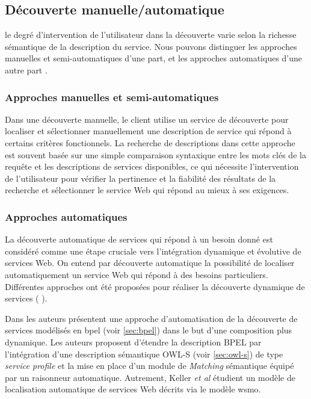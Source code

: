   \subsection{Découverte manuelle/automatique}
  \label{sec:ws-desc:manual-vs-auto}
  le degré d'intervention de l'utilisateur dans la découverte varie
  selon la richesse sémantique de la description du service. Nous
  pouvons distinguer les approches manuelles et semi-automatiques d'une
  part, et les approches automatiques d'une autre part
  \cite{elie2010,garofalakis2004web}.

    \subsubsection{Approches manuelles et semi-automatiques}
    Dans une découverte manuelle, le client utilise un service de
    découverte pour localiser et sélectionner manuellement une
    description de service qui répond à certains critères
    fonctionnels. La recherche de descriptions dans cette approche est
    souvent basée sur une simple comparaison syntaxique entre les mots
    clés de la requête et les descriptions de services disponibles, ce
    qui nécessite l'intervention de l'utilisateur pour vérifier la
    pertinence et la fiabilité des résultats de la recherche et
    sélectionner le service Web qui répond au mieux à ses exigences.

    \subsubsection{Approches automatiques}
    La découverte automatique de services qui répond à un besoin donné
    est considéré comme une étape cruciale vers l'intégration
    dynamique et évolutive de services Web. On entend par découverte
    automatique la possibilité de localiser automatiquement un service
    Web qui répond à des besoins particuliers. Différentes
    approches ont été proposées pour réaliser la
    découverte dynamique de services ( \cite{paolucci2002semantic,
      bernstein2002discovering, mandell2003bottom,
      benatallah2005automating,keller2005automatic}).\medskip

    Dans \cite{mandell2003bottom} les auteurs présentent une approche
    d'automatisation de la découverte de services modélisés en
    \acrshort{bpel} (voir \ref{sec:bpel}) dans le but d'une
    composition plus dynamique. Les auteurs proposent d'étendre la
    description \textsc{BPEL} par l'intégration d'une description
    sémantique \textsc{OWL-S} (voir \ref{sec:owl-s}) de type
    \textit{service profile} et la mise en place d'un module de
    \textit{Matching} sémantique équipé par un raisonneur
    automatique. Autrement, Keller \textit{et al}
    \cite{keller2005automatic} étudient un modèle de localisation
    automatique de services Web décrits via le modèle \acrshort{wsmo}.


